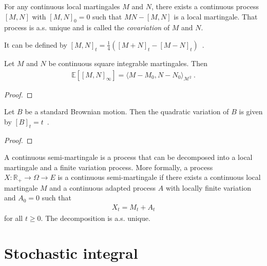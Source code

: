 \begin{definition}[Covariation]\label{def:covariation}
For any continuous local martingales $M$ and $N$, there exists a continuous process $[M,N]$ with $[M,N]_0 = 0$ such that $MN - [M,N]$ is a local martingale. That process is a.s. unique and is called the \emph{covariation} of $M$ and $N$.

It can be defined by $[M, N]_t = \frac{1}{4}\left([M+N]_t - [M-N]_t \right)$~.
\end{definition}


\begin{lemma}\label{lem:covariation_eq_inner}
Let $M$ and $N$ be continuous square integrable martingales. Then
\begin{align*}
  \mathbb{E}\left[[M,N]_\infty\right] = \langle M - M_0, N - N_0 \rangle_{\mathcal{M}^2}
  \: .
\end{align*}
\end{lemma}

\begin{proof}

\end{proof}


\begin{lemma}\label{lem:quadraticVariation_brownian}
Let $B$ be a standard Brownian motion. Then the quadratic variation of $B$ is given by $[B]_t = t$~.
\end{lemma}

\begin{proof}

\end{proof}


\begin{definition}\label{def:continuousSemiMartingale}
A continuous semi-martingale is a process that can be decomposed into a local martingale and a finite variation process.
More formally, a process $X : \mathbb{R}_+ \to \Omega \to E$ is a continuous semi-martingale if there exists a continuous local martingale $M$ and a continuous adapted process $A$ with locally finite variation and $A_0 = 0$ such that
\begin{align*}
  X_t = M_t + A_t
\end{align*}
for all $t \ge 0$.
The decomposition is a.s. unique.
\end{definition}


\section{Stochastic integral}


